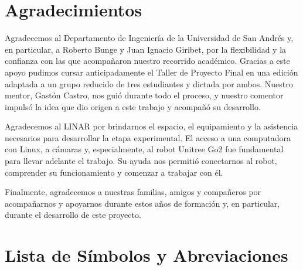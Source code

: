 \documentclass[12pt,a4paper]{report}
\begin{document}
\chapter*{Agradecimientos}
Agradecemos al Departamento de Ingeniería de la Universidad de San Andrés y,
en particular, a Roberto Bunge y Juan Ignacio Giribet, por la flexibilidad y la
confianza con las que acompañaron nuestro recorrido académico. Gracias a este
apoyo pudimos cursar anticipadamente el Taller de Proyecto Final en una edición
adaptada a un grupo reducido de tres estudiantes y dictada por ambos. Nuestro
mentor, Gastón Castro, nos guió durante todo el proceso, y nuestro comentor
impulsó la idea que dio origen a este trabajo y acompañó su desarrollo.

Agradecemos al LINAR por brindarnos el espacio, el equipamiento y la asistencia
necesarios para desarrollar la etapa experimental. El acceso a una computadora
con Linux, a cámaras y, especialmente, al robot Unitree Go2 fue fundamental para
llevar adelante el trabajo. Su ayuda nos permitió conectarnos al robot,
comprender su funcionamiento y comenzar a trabajar con él.

Finalmente, agradecemos a nuestras familias, amigos y compañeros por
acompañarnos y apoyarnos durante estos años de formación y, en particular,
durante el desarrollo de este proyecto.
\newpage

\newpage
\tableofcontents
\thispagestyle{empty}
\newpage
\listoftables
\newpage
\listoffigures

\newpage
\chapter*{Lista de Símbolos y Abreviaciones}
\end{document}

